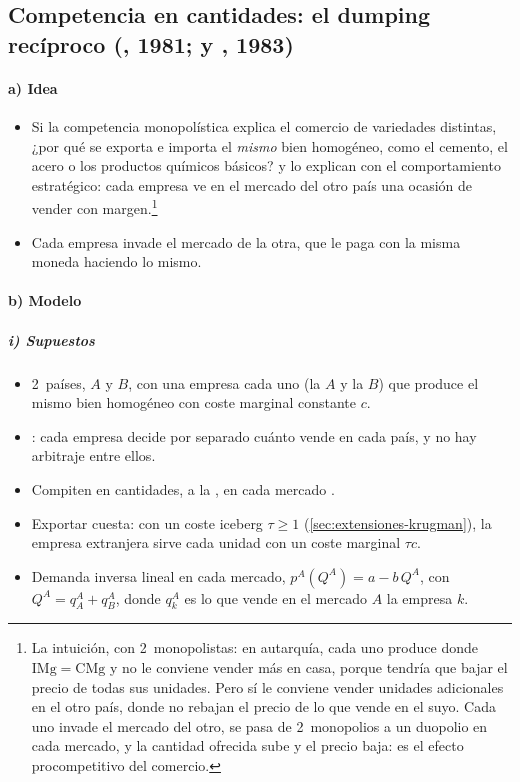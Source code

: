 \documentclass[11pt]{article}
\begin{document}
\subsection{Competencia en cantidades:\cortetitulo{} el dumping recíproco (, 1981;  y , 1983)}\label{sec:dumping-reciproco}

\paragraph{a) Idea}

\begin{itemize}
\item Si la competencia monopolística explica el comercio de variedades distintas, ¿por qué se exporta e importa el \emph{mismo} bien homogéneo, como el cemento, el acero o los productos químicos básicos? \textcite{Brander1981Intra} y \textcite{BranderKrugman1983Reciprocal} lo explican con el comportamiento estratégico: cada empresa ve en el mercado del otro país una ocasión de vender con margen.\footnote{La intuición, con 2~monopolistas: en autarquía, cada uno produce donde $\mathrm{IMg}=\mathrm{CMg}$ y no le conviene vender más en casa, porque tendría que bajar el precio de todas sus unidades. Pero sí le conviene vender unidades adicionales en el otro país, donde no rebajan el precio de lo que vende en el suyo. Cada uno invade el mercado del otro, se pasa de 2~monopolios a un duopolio en cada mercado, y la cantidad ofrecida sube y el precio baja: es el efecto procompetitivo del comercio.}
\item Cada empresa invade el mercado de la otra, que le paga con la misma moneda haciendo lo mismo.
\end{itemize}

\paragraph{b) Modelo}

\subparagraph{i) Supuestos}

\begin{itemize}
\item 2~países, $A$ y $B$, con una empresa cada uno (la $A$ y la $B$) que produce el mismo bien homogéneo con coste marginal constante $c$.
\item {}: cada empresa decide por separado cuánto vende en cada país, y no hay arbitraje entre ellos.
\item Compiten en cantidades, a la , en cada mercado .
\item Exportar cuesta: con un coste iceberg $\tau\geq1$ (\ref{sec:extensiones-krugman}), la empresa extranjera sirve cada unidad con un coste marginal $\tau c$.
\item Demanda inversa lineal en cada mercado, $p^A(Q^A)=a-b\,Q^A$, con $Q^A=q_A^A+q_B^A$, donde $q_k^A$ es lo que vende en el mercado $A$ la empresa $k$.
\end{itemize}
\end{document}
